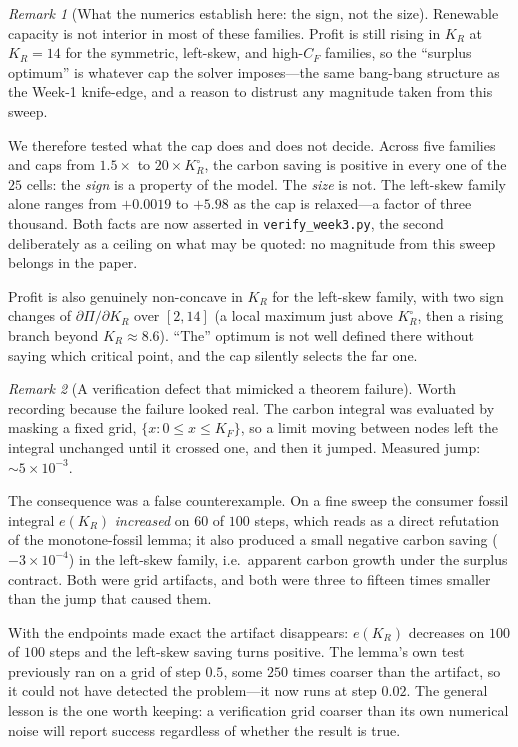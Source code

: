 \documentclass[11pt,reqno]{amsart}
\theoremstyle{plain}
\theoremstyle{definition}
\theoremstyle{remark}
\newtheorem{remark}{Remark}
\newcommand{\KR}{K_R}
\newcommand{\KF}{K_F}
\newcommand{\CF}{C_F}
\begin{document}
\begin{remark}[What the numerics establish here: the sign, not the size]
\label{rem:capinv}
Renewable capacity is not interior in most of these families. Profit is still rising in
$\KR$ at $\KR=14$ for the symmetric, left-skew, and high-$\CF$ families, so the ``surplus
optimum'' is whatever cap the solver imposes---the same bang-bang structure as the Week-1
knife-edge, and a reason to distrust any magnitude taken from this sweep.

We therefore tested what the cap does and does not decide. Across five families and caps
from $1.5\times$ to $20\times\KR^{\circ}$, the carbon saving is positive in every one of the
$25$ cells: the \emph{sign} is a property of the model. The \emph{size} is not. The
left-skew family alone ranges from $+0.0019$ to $+5.98$ as the cap is relaxed---a factor of
three thousand. Both facts are now asserted in \texttt{verify\_week3.py}, the second
deliberately as a ceiling on what may be quoted: no magnitude from this sweep belongs in the
paper.

Profit is also genuinely non-concave in $\KR$ for the left-skew family, with two sign changes
of $\partial\Pi/\partial\KR$ over $[2,14]$ (a local maximum just above $\KR^{\circ}$, then a
rising branch beyond $\KR\approx8.6$). ``The'' optimum is not well defined there without
saying which critical point, and the cap silently selects the far one.
\end{remark}

\begin{remark}[A verification defect that mimicked a theorem failure]
\label{rem:quadfix}
Worth recording because the failure looked real. The carbon integral was evaluated by
masking a fixed grid, $\{x: 0\le x\le \KF\}$, so a limit moving between nodes left the
integral unchanged until it crossed one, and then it jumped. Measured jump: $\sim5\times
10^{-3}$.

The consequence was a false counterexample. On a fine sweep the consumer fossil integral
$e(\KR)$ \emph{increased} on $60$ of $100$ steps, which reads as a direct refutation of the
monotone-fossil lemma; it also produced a small negative carbon saving ($-3\times10^{-4}$)
in the left-skew family, i.e.\ apparent carbon growth under the surplus contract. Both were
grid artifacts, and both were three to fifteen times smaller than the jump that caused them.

With the endpoints made exact the artifact disappears: $e(\KR)$ decreases on $100$ of $100$
steps and the left-skew saving turns positive. The lemma's own test previously ran on a grid
of step $0.5$, some $250$ times coarser than the artifact, so it could not have detected the
problem---it now runs at step $0.02$. The general lesson is the one worth keeping: a
verification grid coarser than its own numerical noise will report success regardless of
whether the result is true.
\end{remark}
\end{document}
